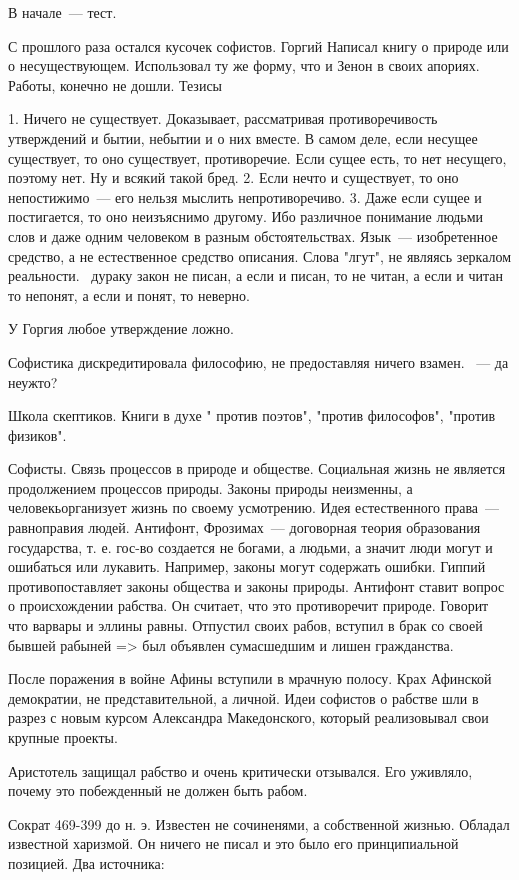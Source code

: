 В начале~--- тест. 

С прошлого раза остался кусочек софистов. 
Горгий 
Написал книгу о природе или о несуществующем. Использовал ту же форму, что и Зенон в своих апориях. Работы, конечно не дошли. 
Тезисы

	1. Ничего не существует. Доказывает, рассматривая противоречивость утверждений и бытии, небытии и о них вместе. 
	В самом деле, если несущее существует, то оно существует, противоречие. Если сущее есть, то нет несущего, поэтому нет. Ну и всякий такой бред. 
	2. Если нечто и существует, то оно непостижимо~--- его нельзя мыслить непротиворечиво. 
	3. Даже если сущее и постигается, то оно неизъяснимо другому. Ибо различное понимание людьми слов и даже одним человеком в разным обстоятельствах. 
	Язык~--- изобретенное средство, а не естественное средство описания. Слова "лгут", не являясь зеркалом реальности. ~дураку закон не писан, а если и писан, то не читан, а если и читан то непонят, а если и понят, то неверно. 

У Горгия любое утверждение ложно. 

Софистика дискредитировала философию, не предоставляя ничего взамен. ~--- да неужто?

Школа скептиков. Книги в духе " против поэтов", "против философов", "против физиков". 

Софисты. 
Связь процессов в природе и обществе. Социальная жизнь не является продолжением процессов природы. Законы природы неизменны, а человекьорганизует жизнь по своему усмотрению. 
Идея естественного права~--- равноправия людей. Антифонт, Фрозимах~--- договорная теория образования государства, т. е. гос-во создается не богами, а людьми, а значит люди могут и ошибаться или лукавить. Например, законы могут содержать ошибки. 
Гиппий противопоставляет законы общества и законы природы. Антифонт ставит вопрос о происхождении рабства. 
Он считает, что это противоречит природе. Говорит что варвары и эллины равны. 
Отпустил своих рабов, вступил в брак со своей бывшей рабыней => был объявлен сумасшедшим и лишен гражданства. 

После поражения в войне Афины вступили в мрачную полосу. Крах Афинской демократии, не представительной, а личной. Идеи софистов о рабстве шли в разрез с новым курсом Александра Македонского, который реализовывал свои крупные проекты. 

Аристотель защищал рабство и очень критически отзывался. Его уживляло, почему это побежденный не должен быть рабом. 

Сократ
469-399 до н. э. 
Известен не сочиненями, а собственной жизнью. Обладал известной харизмой. Он ничего не писал и это было его принципиальной позицией. Два источника: 

